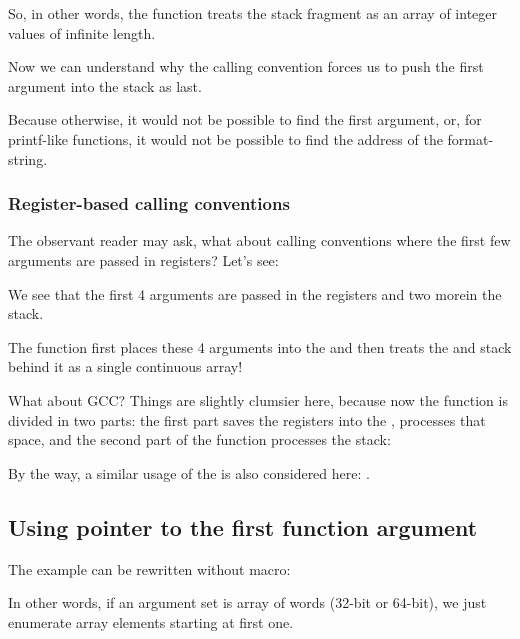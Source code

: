 So, in other words, the function treats the stack fragment as an array of integer values of infinite
length.

Now we can understand why the  calling convention forces us to push the first argument 
into the stack as last.

Because otherwise, it would not be possible to find the first argument, 
or, for printf-like functions, it would not be possible to find the address of the format-string.

\subsubsection{Register-based calling conventions}
\label{variadic_arith_registers}

The observant reader may ask, what about calling conventions where the first few arguments are passed in registers?
Let's see:



We see that the first 4 arguments are passed in the registers and two more\EMDASH{}in the stack.

The  function first places these 4 arguments into the  and then treats
the  and stack behind it as a single continuous array!

What about GCC? Things are slightly clumsier here, because now the function is divided in two parts:
the first part saves the registers into the , processes that space, and the second part of the function processes 
the stack:



By the way, a similar usage of the  is also considered here: .

\subsection{Using pointer to the first function argument}

The example can be rewritten without  macro:



In other words, if an argument set is array of words (32-bit or 64-bit), we just enumerate array elements starting
at first one.

